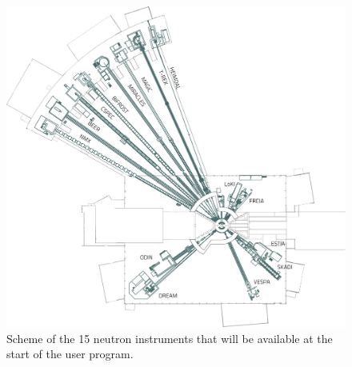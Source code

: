 \begin{figure}[!ht]
  \centering
  \includegraphics[width=\textwidth]{02_BeamDiag/figures/fig000_ESS_instruments}
  \caption{Scheme of the 15 neutron instruments that will be available at the start of the user program.}  
  \label{chap3:fig:ESS_instruments}
\end{figure}
